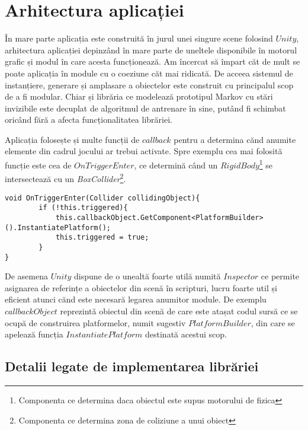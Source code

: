 \chapter{Arhitectura aplicației}

În mare parte aplicația este construită în jurul unei singure scene folosind $Unity$, arhitectura aplicației depinzând în mare parte de uneltele disponibile în motorul grafic și modul în care acesta funcționează. Am încercat să împart căt de mult se poate aplicația în module cu o coeziune căt mai ridicată. De acceea sistemul de instanțiere, generare și amplasare a obiectelor este construit cu principalul scop de a fi modular. Chiar și librăria ce modelează prototipul Markov cu stări invizibile este decuplat de algoritmul de antrenare în sine, putând fi schimbat oricând fără a afecta funcționalitatea librăriei.\par

Aplicația folosește și multe funcții de $callback$ pentru a determina cănd anumite elemente din cadrul jocului ar trebui activate. Spre exemplu cea mai folosită funcție este cea de $OnTriggerEnter$, ce determină când un $RigidBody$\footnote{Componenta ce determina daca obiectul este supus motorului de fizica} se intersectează cu un \textit{Box}\textit{Collider}\footnote{Componenta ce determina zona de coliziune a unui obiect}.\par

\begin{lstlisting}[caption=Exemplu de utilizare a functiei OnTriggerEnter]
void OnTriggerEnter(Collider collidingObject){
        if (!this.triggered){
            this.callbackObject.GetComponent<PlatformBuilder>().InstantiatePlatform();
            this.triggered = true;
        }
}
\end{lstlisting}
\par

De asemena $Unity$ dispune de o unealtă foarte utilă numită $Inspector$ ce permite asignarea de referințe a obiectelor din scenă în scripturi, lucru foarte util și eficient atunci cănd este necesară legarea anumitor module. De exemplu $callbackObject$ reprezintă obiectul din scenă de care este atașat codul sursă ce se ocupă de construirea platformelor, numit sugestiv $PlatformBuilder$, din care se apelează funcția $InstantiatePlatform$ destinată acestui scop.\par

\section{Detalii legate de implementarea librăriei}

